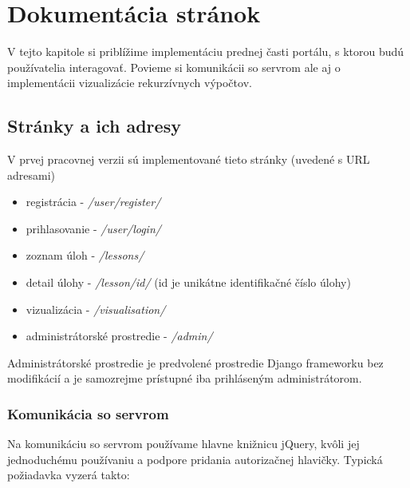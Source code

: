 \chapter{Dokumentácia stránok}

\label{kap:frontImpl}
V tejto kapitole si priblížime implementáciu prednej časti portálu, s ktorou
budú používatelia interagovať. Povieme si komunikácii so servrom ale aj o
implementácii vizualizácie rekurzívnych výpočtov.
\section{Stránky a ich adresy}
V prvej pracovnej verzii sú implementované tieto stránky (uvedené s URL adresami)
\begin{itemize}
  \item registrácia - \textit{/user/register/}
  \item prihlasovanie - \textit{/user/login/}
  \item zoznam úloh - \textit{/lessons/}
  \item detail úlohy - \textit{/lesson/id/} (id je unikátne identifikačné číslo úlohy)
  \item vizualizácia - \textit{/visualisation/}
  \item administrátorské prostredie - \textit{/admin/}
\end{itemize}

Administrátorské prostredie je predvolené prostredie Django frameworku bez modifikácií a je
samozrejme prístupné iba prihláseným administrátorom.
\subsection{Komunikácia so servrom}
Na komunikáciu so servrom používame hlavne knižnicu jQuery, kvôli jej jednoduchému
používaniu a podpore pridania autorizačnej hlavičky. Typická požiadavka vyzerá takto:


